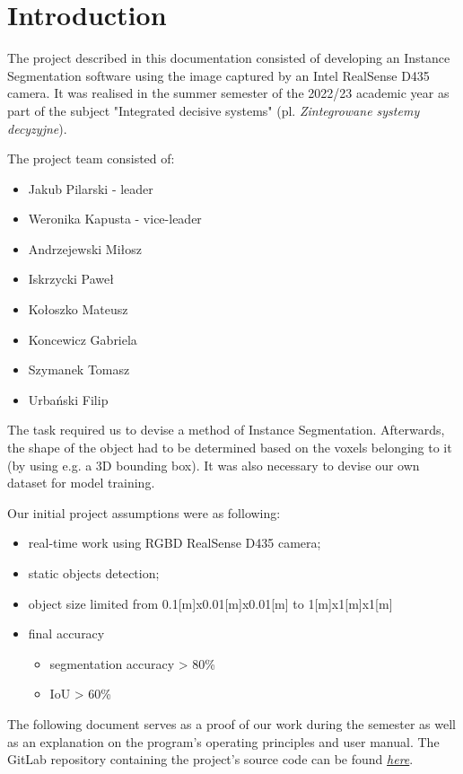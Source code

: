 \chapter*{Introduction}

The project described in this documentation consisted of developing an Instance Segmentation software using the image captured by an Intel RealSense D435 camera. It was realised in the summer semester of the 2022/23 academic year as part of the subject "Integrated decisive systems" (pl. \textit{Zintegrowane systemy decyzyjne}).

\noindent The project team consisted of:
\begin{itemize}[noitemsep,topsep=0pt,parsep=0pt,partopsep=0pt]
    \item Jakub Pilarski - leader
    \item Weronika Kapusta - vice-leader
    \item Andrzejewski Miłosz
    \item Iskrzycki Paweł
    \item Kołoszko Mateusz 
    \item Koncewicz Gabriela
    \item Szymanek Tomasz
    \item Urbański Filip 
\end{itemize}

The task required us to devise a method of Instance Segmentation. Afterwards, the shape of the object had to be determined based on the voxels belonging to it (by using e.g. a 3D bounding box). It was also necessary to devise our own dataset for model training.

\noindent Our initial project assumptions were as following:
\begin{itemize}[noitemsep,topsep=0pt]
    \item real-time work using RGBD RealSense D435 camera;
    \item static objects detection;
    \item object size limited from 0.1[m]x0.01[m]x0.01[m] to 1[m]x1[m]x1[m]
    \item final accuracy
    \begin{itemize}[noitemsep,topsep=0pt]
        \item segmentation accuracy > 80\%
        \item IoU > 60\%
    \end{itemize}
\end{itemize}

The following document serves as a proof of our work during the semester as well as an explanation on the program's operating principles and user manual. The GitLab repository containing the project's source code can be found \href{https://git.pg.edu.pl/p1304095/zsd-is}{\textit{here}}.
